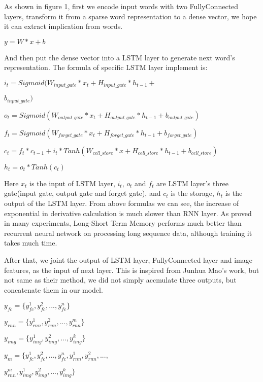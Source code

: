 \documentclass[10pt,twocolumn,letterpaper]{article}
\begin{document}
As shown in figure 1, first we encode input words with two FullyConnected layers, transform it from a sparse word representation to a dense vector, we hope it can extract implication from words.

\begin{center}
$
y = W * x + b
$
\end{center}


And then put the dense vector into a LSTM layer to generate next word’s representation. The formula of specific LSTM layer implement is:
\begin{center}
$
i_{t} = Sigmoid(W_{input\_gate} * x_{t} + H_{input\_gate} * h_{t-1} + $

$b_{input\_gate})
$

$
o_{t} = Sigmoid(W_{output\_gate} * x_{t} + H_{output\_gate} * h_{t-1} + b_{output\_gate})
$

$
f_{t} = Sigmoid(W_{forget\_gate} * x_{t} + H_{forget\_gate} * h_{t-1} + b_{forget\_gate})
$

$
c_{t} = f_{t} * c_{t-1} + i_{t} * Tanh(W_{cell\_store} * x + H_{cell\_store} * h_{t-1} + b_{cell\_store})
$

$
h_{t} = o_{t} * Tanh(c_{t})
$
\end{center}

Here $x_{t}$ is the input of LSTM layer, $i_{t}$, $o_{t}$ and $f_{t}$ are LSTM layer’s three gate(input gate, output gate and forget gate), and $c_{t}$ is the storage, $h_{t}$ is the output of the LSTM layer. From above formulas we can see, the increase of exponential in derivative calculation is much slower than RNN layer. As proved in many experiments, Long-Short Term Memory performs much better than recurrent neural network on processing long sequence data, although training it takes much time. 


After that, we joint the output of LSTM layer, FullyConnected layer and image features, as the input of next layer. This is inspired from Junhua Mao’s work, but not same as their method, we did not simply accmulate three outputs, but concatenate them in our model.

\begin{center}
$
y_{fc} = \{y_{fc}^1,y_{fc}^2, ..., y_{fc}^n\}
$

$
y_{rnn} = \{y_{rnn}^1,y_{rnn}^2, ..., y_{rnn}^m\}$

$y_{img} = \{y_{img}^1,y_{img}^2, ..., y_{img}^k\}$

$y_{m} = \{y_{fc}^1,y_{fc}^2, ..., y_{fc}^n,y_{rnn}^1,y_{rnn}^2, ..., $

$y_{rnn}^m,y_{img}^1,y_{img}^2, ..., y_{img}^k\}$

\end{center}
\end{document}
